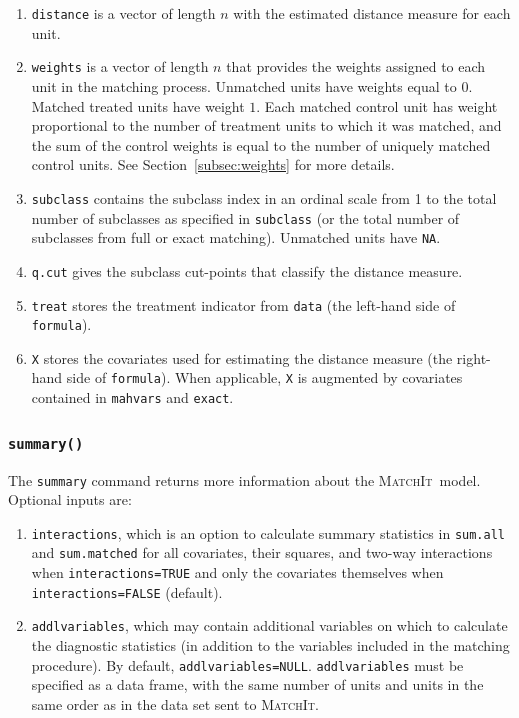 \documentclass[oneside,letterpaper,titlepage]{article}
\newcommand{\MatchIt}{\textsc{MatchIt}}
\begin{document}
\begin{enumerate}
\item \texttt{distance} is a vector of length $n$ with the estimated
  distance measure for each unit.
  
\item \texttt{weights} is a vector of length $n$ that provides the
  weights assigned to each unit in the matching process.  Unmatched
  units have weights equal to $0$. Matched treated units have weight
  $1$.  Each matched control unit has weight proportional to the
  number of treatment units to which it was matched, and the sum of
  the control weights is equal to the number of uniquely matched
  control units. See Section~\ref{subsec:weights} for more details.
  
\item \texttt{subclass} contains the subclass index in an ordinal
  scale from 1 to the total number of subclasses as specified in
  \texttt{subclass} (or the total number of subclasses from full or
  exact matching).  Unmatched units have \texttt{NA}.
  
\item \texttt{q.cut} gives the subclass cut-points that classify the
  distance measure.
  
\item \texttt{treat} stores the treatment indicator from \texttt{data}
  (the left-hand side of \texttt{formula}).
 
\item \texttt{X} stores the covariates used for estimating the
  distance measure (the right-hand side of \texttt{formula}).  When
  applicable, \texttt{X} is augmented by covariates contained in
  \texttt{mahvars} and \texttt{exact}. 
\end{enumerate}


\subsubsection{{\tt summary()}}
The \texttt{summary} command returns more information about the
\MatchIt\ model.  Optional inputs are:

\begin{enumerate}
\item \texttt{interactions}, which is an option to calculate summary
  statistics in \texttt{sum.all} and \texttt{sum.matched} for all
  covariates, their squares, and two-way interactions when
  \texttt{interactions=TRUE} and only the covariates themselves when
  \texttt{interactions=FALSE} (default).
\item \texttt{addlvariables}, which may contain additional variables
  on which to calculate the diagnostic statistics (in addition to the
  variables included in the matching procedure).  By default,
  \texttt{addlvariables=NULL}.  \texttt{addlvariables} must be
  specified as a data frame, with the same number of units and units
  in the same order as in the data set sent to \MatchIt .
\end{enumerate}
\end{document}
